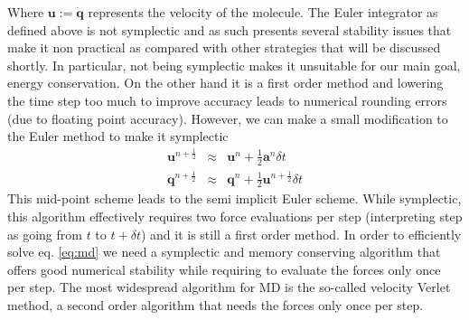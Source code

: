 \documentclass[ twoside,openright,titlepage,numbers=noenddot,%
headinclude,footinclude,cleardoublepage=empty,abstract=on,
BCOR=5mm,paper=a4,fontsize=11pt, dvipsnames
]{scrreprt}
\renewcommand{\vec}[1]{\bm{#1}}
\newcommand{\dt}{\delta t}
\newcommand{\half}{\frac{1}{2}}
\newcommand{\ppos}{q}
\newcommand{\pvel}{u}
\begin{document}
Where $\vec{\pvel} := \dot{\vec{\ppos}}$ represents the velocity of the molecule.
The Euler integrator as defined above is not symplectic\cite{Hairer2006} and as such presents several stability issues that make it non practical as compared with other strategies that will be discussed shortly. In particular, not being symplectic makes it unsuitable for our main goal, energy conservation\cite{Hairer2006}. On the other hand it is a first order method and lowering the time step too much to improve accuracy leads to numerical rounding errors (due to floating point accuracy).
However, we can make a small modification to the Euler method to make it symplectic\cite{Hairer2006}
\begin{equation}
  \label{eq:semiimpliciteuler}
  \begin{aligned}
    \vec{\pvel}^{n+\half} &\approx& \vec{\pvel}^n + \half\vec{a}^n\dt\\
    \vec{\ppos}^{n+\half} &\approx& \vec{\ppos}^n + \half\vec{\pvel}^{n+\half}\dt
  \end{aligned}
\end{equation}
This mid-point scheme leads to the semi implicit Euler scheme. While symplectic, this algorithm effectively requires two force evaluations per step (interpreting step as going from $t$ to $t+\dt$) and it is still a first order method.
In order to efficiently solve eq. \eqref{eq:md} we need a symplectic and memory conserving algorithm that offers good numerical stability while requiring to evaluate the forces only once per step.
The most widespread algorithm for \gls{MD} is the so-called velocity Verlet method\cite{Allen2017}, a second order algorithm that needs the forces only once per step.
\end{document}

